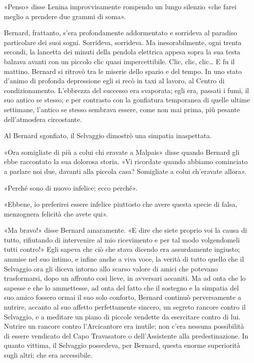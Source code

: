\documentclass[
a5paper, %
10pt, %
twoside, 
onecolumn, %
openany, %
]{memoir}
\begin{document}
«Penso» disse Lenina improvvisamente rompendo un lungo silenzio «che farei meglio a prendere due grammi di soma».

Bernard, frattanto, s’era profondamente addormentato e sorrideva al paradiso particolare dei suoi sogni. Sorrideva, sorrideva. Ma inesorabilmente, ogni trenta secondi, la lancetta dei minuti della pendola elettrica appesa sopra la sua testa balzava avanti con un piccolo clic quasi impercettibile. Clic, clic, clic… E fu il mattino. Bernard si ritrovò tra le miserie dello spazio e del tempo. In uno stato d’animo di profonda depressione egli si recò in taxi al lavoro, al Centro di condizionamento. L’ebbrezza del successo era svaporata; egli era, passati i fumi, il suo antico se stesso; e per contrasto con la gonfiatura temporanea di quelle ultime settimane, l’antico se stesso sembrava essere, come non mai prima, più pesante dell’atmosfera circostante.

Al Bernard sgonfiato, il Selvaggio dimostrò una simpatia inaspettata.

«Ora somigliate di più a colui chi eravate a Malpais» disse quando Bernard gli ebbe raccontato la sua dolorosa storia. «Vi ricordate quando abbiamo cominciato a parlare noi due, davanti alla piccola casa? Somigliate a colui ch’eravate allora».

«Perché sono di nuovo infelice; ecco perché».

«Ebbene, io preferirei essere infelice piuttosto che avere questa specie di falsa, menzognera felicità che avete qui».

«Ma bravo!» disse Bernard amaramente. «E dire che siete proprio voi la causa di tutto, rifiutando di intervenire al mio ricevimento e per tal modo volgendomeli tutti contro!» Egli sapeva che ciò che stava dicendo era assurdamente ingiusto; ammise nel suo intimo, e infine anche a viva voce, la verità di tutto quello che il Selvaggio ora gli diceva intorno allo scarso valore di amici che potevano trasformarsi, dopo un affronto così lieve, in avversari accaniti. Ma ad onta che lo sapesse e che lo ammettesse, ad onta del fatto che il sostegno e la simpatia del suo amico fossero ormai il suo solo conforto, Bernard continuò perversamente a nutrire, accanto al suo affetto perfettamente sincero, un segreto rancore contro il Selvaggio, e a meditare un piano di piccole vendette da esercitare contro di lui. Nutrire un rancore contro l’Arcicantore era inutile; non c’era nessuna possibilità di essere vendicato del Capo Travasatore o dell’Assistente alla predestinazione. In quanto vittima, il Selvaggio possedeva, per Bernard, questa enorme superiorità sugli altri; che era accessibile.
\end{document}
